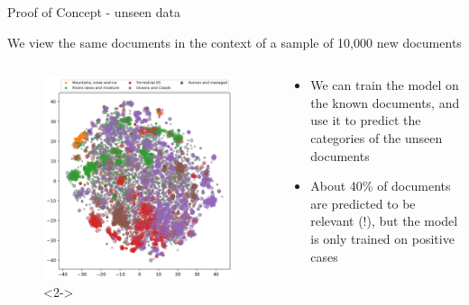 \documentclass[9pt]{beamer}
\begin{document}
\begin{frame}{Proof of Concept - unseen data}

	We view the same documents in the context of a sample of 10,000 new documents

	\begin{columns}
	\begin{column}{0.618\linewidth}
		\begin{figure}
			\includegraphics[width=\linewidth]{../plots/predicted_unseen_cats.png}<2->
		\end{figure}
	\end{column}
	\begin{column}{0.382\linewidth}
		\begin{itemize}
			\item<2-> We can train the model on the known documents, and use it to predict the categories of the unseen documents
			\item<3-> About 40\% of documents are predicted to be relevant (!), but the model is only trained on positive cases
			
		\end{itemize}
		

\end{column}
\end{columns}
\end{frame}
\end{document}
